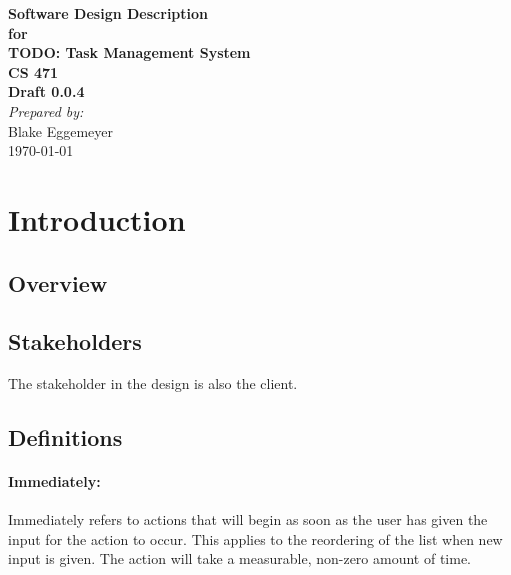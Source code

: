 \documentclass[12pt]{article}
\begin{document}
\begin{titlepage}
\begin{flushright} 
{\LARGE \bfseries Software Design Description}\\[1.2cm]
{\large \bfseries for}\\[1.2cm]
{\huge \bfseries TODO: Task Management System}\\[1.2cm]
{\large \bfseries CS 471}\\
\vfill
{\large \bfseries Draft 0.0.4}\\[2cm]
\emph{Prepared by:} \\
Blake Eggemeyer \\ [3cm]
{\large \today}
\end{flushright}
\end{titlepage}
\setcounter{tocdepth}{3}
\setcounter{secnumdepth}{5}
\tableofcontents
\newpage

\section{Introduction}

\subsection{Overview}

\subsection{Stakeholders}
The stakeholder in the design is also the client.

\subsection{}

\subsection{Definitions}
\setcounter{paragraph}{0}
\setcounter{subsubsection}{1}
\paragraph{Immediately:} Immediately refers to actions that will begin as soon as the user has given the input for the action to occur.  This applies to the reordering of the list when new input is given.  The action will take a measurable, non-zero amount of time.
\end{document}
